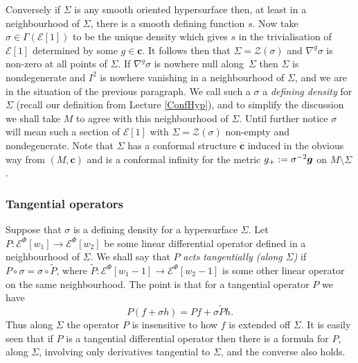 \documentclass[a4paper,12pt]{amsart}
\def\g{g_+}
\def\Cal{\mathcal}
\newcommand{\cc}{\boldsymbol{c}}
\newcommand{\ce}{{\Cal E}}
\def\bg{\mbox{\boldmath $g$}}
\newcommand{\si}{\sigma}
\theoremstyle{remark}
\begin{document}
Conversely if $\Sigma$ is any smooth oriented hypersurface then, at
least in a neighbourhood of $\Sigma$, there is a smooth defining
function $s$.  Now take $\si\in \Gamma (\ce[1])$ to be the unique density which gives $s$ in the trivialisation of $\ce[1]$ determined by some $g\in \cc$. It follows then that $\Sigma =\mathcal{Z}(\si)$ and $\nabla^g \si $ is non-zero at all points of $\Sigma$. If $\nabla^g \si $ is nowhere null along~$\Sigma$ then $\Sigma$ is nondegenerate and $I^2$ is nowhere vanishing in a neighbourhood of $\Sigma$, and we are in the situation of the previous paragraph. We call such a $\si$ a {\em
defining density} for $\Sigma$ (recall our definition from Lecture \ref{ConfHyp}), and to simplify the discussion we shall take $M$ to agree with this neighbourhood of $\Sigma$. Until further notice $\si$ will mean such a section of $\ce[1]$ with $\Sigma=\mathcal{Z}(\si)$ non-empty and nondegenerate.  Note that $\Sigma$ has a conformal structure $\overline{\cc}$ induced in the obvious way from $(M,\cc)$ and is a conformal infinity for the metric $\g:= \si^{-2}\bg$ on $M\setminus \Sigma$. 

\subsubsection{Tangential operators}\label{tanS}
Suppose that $\si$ is a defining density for a hypersurface $\Sigma$.
Let $P: \ce^\Phi[w_1]\to \ce^\Phi[w_2]$ be some linear differential
 operator defined in a neighbourhood of $\Sigma$. 
 We shall say that $P$ {\em acts
  tangentially (along $\Sigma$)} if $P \circ \si =\si \circ \widetilde P $, where $\widetilde P
:\ce^\Phi[w_1-1]\to \ce^\Phi[w_2-1]$ is some other linear
 operator on the same neighbourhood.
The point is that for a tangential operator $P$ we have 
$$
P (f+\si h)= P f+ \si \widetilde P h.
$$  
Thus along $\Sigma$ the operator $P$ is insensitive to how $f$ is
extended off $\Sigma$.  It is easily seen that if $P$ is a tangential differential operator then there is a formula for $P$,
along $\Sigma$, involving only derivatives tangential to $\Sigma$, and
the converse also holds.
\end{document}
